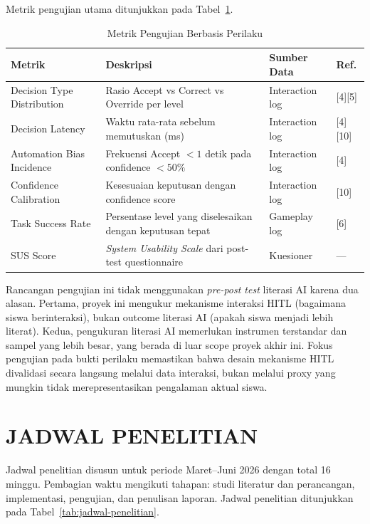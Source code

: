 Metrik pengujian utama ditunjukkan pada Tabel~\ref{tab:metrik-pengujian}.

\begin{table}[H]
\centering
\caption{Metrik Pengujian Berbasis Perilaku}
\label{tab:metrik-pengujian}
\begin{tabular}{|p{3.5cm}|p{4cm}|p{3cm}|p{2cm}|}
\hline
\textbf{Metrik} & \textbf{Deskripsi} & \textbf{Sumber Data} & \textbf{Ref.} \\ \hline
Decision Type Distribution & Rasio Accept vs Correct vs Override per level & Interaction log & [4][5] \\ \hline
Decision Latency & Waktu rata-rata sebelum memutuskan (ms) & Interaction log & [4][10] \\ \hline
Automation Bias Incidence & Frekuensi Accept $< 1$ detik pada confidence $< 50\%$ & Interaction log & [4] \\ \hline
Confidence Calibration & Kesesuaian keputusan dengan confidence score & Interaction log & [10] \\ \hline
Task Success Rate & Persentase level yang diselesaikan dengan keputusan tepat & Gameplay log & [6] \\ \hline
SUS Score & \textit{System Usability Scale} dari post-test questionnaire & Kuesioner & --- \\ \hline
\end{tabular}
\end{table}

Rancangan pengujian ini tidak menggunakan \textit{pre-post test} literasi AI karena dua alasan. Pertama, proyek ini mengukur mekanisme interaksi HITL (bagaimana siswa berinteraksi), bukan outcome literasi AI (apakah siswa menjadi lebih literat). Kedua, pengukuran literasi AI memerlukan instrumen terstandar dan sampel yang lebih besar, yang berada di luar scope proyek akhir ini. Fokus pengujian pada bukti perilaku memastikan bahwa desain mekanisme HITL divalidasi secara langsung melalui data interaksi, bukan melalui proxy yang mungkin tidak merepresentasikan pengalaman aktual siswa.


\section{JADWAL PENELITIAN}
\label{sec:jadwal-penelitian}

Jadwal penelitian disusun untuk periode Maret--Juni 2026 dengan total 16 minggu. Pembagian waktu mengikuti tahapan: studi literatur dan perancangan, implementasi, pengujian, dan penulisan laporan. Jadwal penelitian ditunjukkan pada Tabel~\ref{tab:jadwal-penelitian}.

